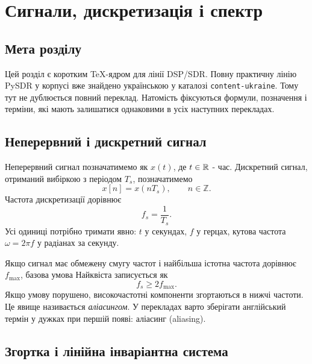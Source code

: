 \chapter{Сигнали, дискретизація і спектр}

\section{Мета розділу}

Цей розділ є коротким TeX-ядром для лінії DSP/SDR. Повну практичну лінію PySDR у корпусі вже знайдено українською у каталозі \texttt{content-ukraine}. Тому тут не дублюється повний переклад. Натомість фіксуються формули, позначення і терміни, які мають залишатися однаковими в усіх наступних перекладах.


\section{Неперервний і дискретний сигнал}

Неперервний сигнал позначатимемо як $x(t)$, де $t\in\mathbb{R}$ - час. Дискретний сигнал, отриманий вибіркою з періодом $T_s$, позначатимемо
\begin{equation}
    x[n] = x(nT_s), \qquad n\in\mathbb{Z}.
\end{equation}
Частота дискретизації дорівнює
\begin{equation}
    f_s = \frac{1}{T_s}.
\end{equation}
Усі одиниці потрібно тримати явно: $t$ у секундах, $f$ у герцах, кутова частота $\omega=2\pi f$ у радіанах за секунду.

Якщо сигнал має обмежену смугу частот і найбільша істотна частота дорівнює $f_{\max}$, базова умова Найквіста записується як
\begin{equation}
    f_s \geq 2 f_{\max}.
\end{equation}
Якщо умову порушено, високочастотні компоненти згортаються в нижчі частоти. Це явище називається \emph{аліасингом}. У перекладах варто зберігати англійський термін у дужках при першій появі: аліасинг (aliasing).

\section{Згортка і лінійна інваріантна система}

